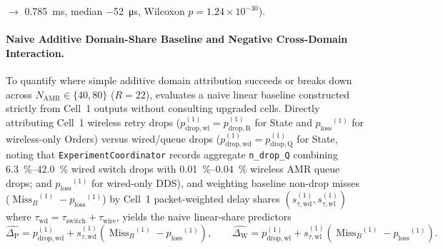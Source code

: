 \documentclass[11pt,a4paper]{article}
\newcommand{\Namr}{\ensuremath{N_{\mathrm{AMR}}}}
\newcommand{\MissB}{\ensuremath{\operatorname{Miss}_B}}
\newcommand{\ploss}{\ensuremath{p_{\mathrm{loss}}}}
\newcommand{\GainP}{\ensuremath{\Delta_{\mathrm{P}}}}
\newcommand{\GainW}{\ensuremath{\Delta_{\mathrm{W}}}}
\begin{document}
$\to$ \qty{0.785}{\milli\second}, median \qty{-52}{\micro\second}, Wilcoxon $p = 1.24 \times 10^{-30}$).

\paragraph{Naive Additive Domain-Share Baseline and Negative Cross-Domain Interaction.}
To quantify where simple additive domain attribution succeeds or breaks down across $\Namr \in \{40, 80\}$ ($R=22$),  evaluates a naive linear baseline constructed strictly from Cell~1 outputs without consulting upgraded cells. Directly attributing Cell~1 wireless retry drops ($p_{\mathrm{drop,wl}}^{(1)} = p_{\mathrm{drop,R}}^{(1)}$ for State and $\ploss^{(1)}$ for wireless-only Orders) versus wired/queue drops ($p_{\mathrm{drop,wd}}^{(1)} = p_{\mathrm{drop,Q}}^{(1)}$ for State, noting that \texttt{ExperimentCoordinator} records aggregate \texttt{n\_drop\_Q} combining \qtyrange{6.3}{42.0}{\percent} wired switch drops with \qtyrange{0.01}{0.04}{\percent} wireless AMR queue drops; and $\ploss^{(1)}$ for wired-only DDS), and weighting baseline non-drop misses ($\MissB^{(1)} - \ploss^{(1)}$) by Cell~1 packet-weighted delay shares $(s_{\tau,\mathrm{wd}}^{(1)}, s_{\tau,\mathrm{wl}}^{(1)})$ where $\tau_{\mathrm{wd}} = \tau_{\mathrm{switch}} + \tau_{\mathrm{wire}}$, yields the naive linear-share predictors
\begin{equation}
\widehat{\GainP} = p_{\mathrm{drop,wd}}^{(1)} + s_{\tau,\mathrm{wd}}^{(1)}\!\left(\MissB^{(1)} - \ploss^{(1)}\right), \qquad
\widehat{\GainW} = p_{\mathrm{drop,wl}}^{(1)} + s_{\tau,\mathrm{wl}}^{(1)}\!\left(\MissB^{(1)} - \ploss^{(1)}\right).
\label{eq:hyp_pred}
\end{equation}
\end{document}

